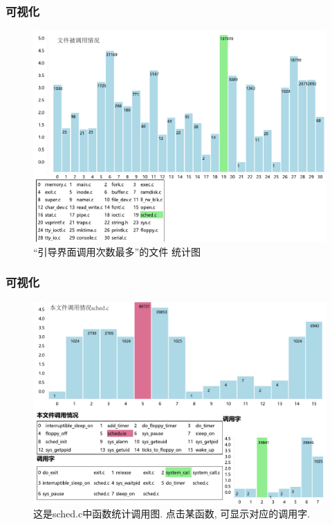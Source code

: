 \documentclass[14pt,UTF-8]{beamer}
\begin{document}
\begin{frame}
\frametitle{可视化}
\begin{figure}[htbp]
	\centering
	\includegraphics[width=\textwidth,natwidth=577 ,natheight=416]{img/calledFile.pdf}
	\caption[]{“引导界面调用次数最多”的文件 统计图}
	\label{fig:calledMaxFilegraph}
\end{figure}
\end{frame}

\begin{frame}
\frametitle{可视化}
\begin{figure}[htbp]
	\centering
	\includegraphics[width=\textwidth,natwidth=590 ,natheight=406]{img/eachFileCall.pdf}
	\caption[]{这是sched.c中函数统计调用图. 点击某函数, 可显示对应的调用字.}
	\label{fig:eachFileCallgraph}
\end{figure}
\end{frame}
\end{document}
